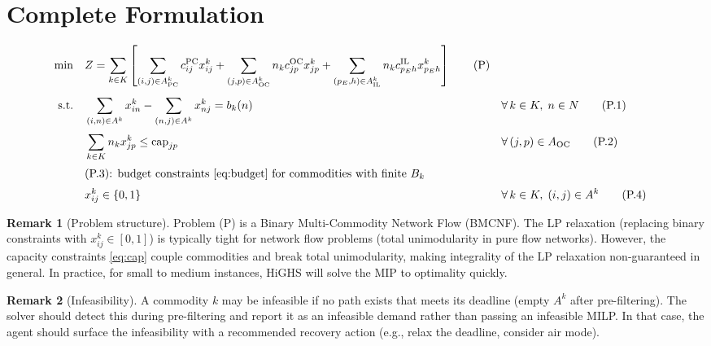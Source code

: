\documentclass[11pt,a4paper]{article}
\theoremstyle{definition}
\newtheorem{remark}{Remark}
\begin{document}
\section{Complete Formulation}

\begin{align}
  \min \quad & Z = \sum_{k \in K} \left[
    \sum_{(i,j) \in A^k_{\text{PC}}} c_{ij}^{\text{PC}} x_{ij}^k
    + \sum_{(j,p) \in A^k_{\text{OC}}} n_k c_{jp}^{\text{OC}} x_{jp}^k
    + \sum_{(p_E,h) \in A^k_{\text{IL}}} n_k c_{p_E h}^{\text{IL}} x_{p_E h}^k
  \right] \tag{P} \label{eq:P} \\[4pt]
  \text{s.t.} \quad
  & \sum_{(i,n) \in A^k} x_{in}^k - \sum_{(n,j) \in A^k} x_{nj}^k = b_k(n)
    && \forall\, k \in K,\; n \in N \tag{P.1} \\[2pt]
  & \sum_{k \in K} n_k x_{jp}^k \leq \text{cap}_{jp}
    && \forall\, (j,p) \in A_{\text{OC}} \tag{P.2} \\[2pt]
  & \text{(P.3): budget constraints \eqref{eq:budget} for commodities with finite } B_k \notag \\[2pt]
  & x_{ij}^k \in \{0,1\}
    && \forall\, k \in K,\; (i,j) \in A^k \tag{P.4}
\end{align}

\begin{remark}[Problem structure]
Problem (P) is a Binary Multi-Commodity Network Flow (BMCNF). The LP relaxation
(replacing binary constraints with $x_{ij}^k \in [0,1]$) is typically tight for
network flow problems (total unimodularity in pure flow networks). However, the
capacity constraints \eqref{eq:cap} couple commodities and break total unimodularity,
making integrality of the LP relaxation non-guaranteed in general. In practice, for
small to medium instances, HiGHS will solve the MIP to optimality quickly.
\end{remark}

\begin{remark}[Infeasibility]
A commodity $k$ may be infeasible if no path exists that meets its deadline (empty
$A^k$ after pre-filtering). The solver should detect this during pre-filtering and
report it as an infeasible demand rather than passing an infeasible MILP. In that
case, the agent should surface the infeasibility with a recommended recovery action
(e.g., relax the deadline, consider air mode).
\end{remark}

\end{document}
